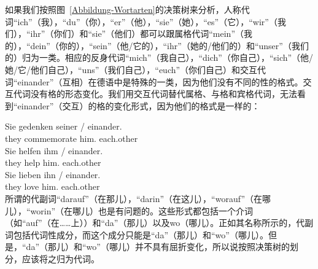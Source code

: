 如果我们按照图~\ref{Abbildung-Wortarten}的决策树来分析，人称代词“ich”（我），“du”（你），“er”（他），“sie”（她），“es”（它），“wir”（我们），“ihr”（你们）和“sie”（他们）都可以跟属格代词“mein”（我的），“dein”（你的），“sein”（他/它的），“ihr”（她的/他们的）和“unser”（我们的）归为一类。相应的反身代词“mich”（我自己），“dich”（你自己），“sich”（他/她/它/他们自己），“uns”（我们自己），“euch”（你们自己）和交互代词“einander”（互相）在德语中是特殊的一类，因为他们没有不同的性的格式。交互代词没有格的形态变化。我们用交互代词替代属格、与格和宾格代词，无法看到“einander”（交互）的格的变化形式，因为他们的格式是一样的：

\eal
\ex 
\gll Sie gedenken seiner / einander.\\
	 they commemorate him.\gen{} {} each.other\\
\ex 
\gll Sie helfen ihm / einander.\\
	 they help him.\dat{} {} each.other\\
\ex 
\gll Sie lieben ihn / einander.\\
	 they love him.\acc{} {} each.other\\
\zl
%
所谓的代副词“darauf”（在那儿），“darin”（在这儿），“worauf”（在哪儿），“worin”（在哪儿）也是有问题的。这些形式都包括一个介词（如“auf”（在……上））和“da”（那儿）以及wo（哪儿）。正如其名称所示的，代副词包括代词性成分，而这个成分只能是“da”（那儿）和“wo”（哪儿）。但是，“da”（那儿）和“wo”（哪儿）并不具有屈折变化，所以说按照决策树的划分，应该将之归为代词。

